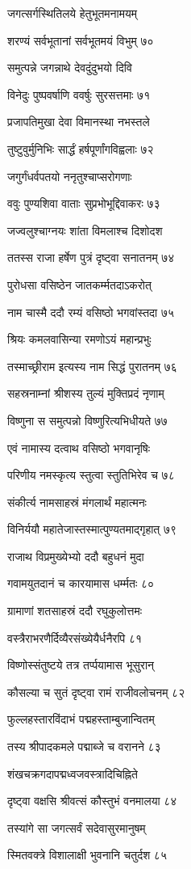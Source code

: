 जगत्सर्गस्थितिलये हेतुभूतमनामयम्

शरण्यं सर्वभूतानां सर्वभूतमयं विभुम् ७०

समुत्पन्ने जगन्नाथे देवदुंदुभयो दिवि

विनेदुः पुष्पवर्षाणि ववर्षुः सुरसत्तमाः ७१

प्रजापतिमुखा देवा विमानस्था नभस्तले

तुष्टुवुर्मुनिभिः सार्द्धं हर्षपूर्णांगविह्वलाः ७२

जगुर्गंधर्वपतयो ननृतुश्चाप्सरोगणाः

ववुः पुण्यशिवा वाताः सुप्रभोभूद्दिवाकरः ७३

जज्वलुश्चाग्नयः शांता विमलाश्च दिशोदश

ततस्स राजा हर्षेण पुत्रं दृष्ट्वा सनातनम् ७४

पुरोधसा वसिष्ठेन जातकर्म्मतदाऽकरोत्

नाम चास्मै ददौ रम्यं वसिष्ठो भगवांस्तदा ७५

श्रियः कमलवासिन्या रमणोऽयं महान्प्रभुः

तस्माच्छ्रीराम इत्यस्य नाम सिद्धं पुरातनम् ७६

सहस्रनाम्नां श्रीशस्य तुल्यं मुक्तिप्रदं नृणाम्

विष्णुना स समुत्पन्नो विष्णुरित्यभिधीयते ७७

एवं नामास्य दत्वाथ वसिष्ठो भगवानृषिः

परिणीय नमस्कृत्य स्तुत्वा स्तुतिभिरेव च ७८

संकीर्त्य नामसाहस्रं मंगलार्थं महात्मनः

विनिर्ययौ महातेजास्तस्मात्पुण्यतमाद्गृहात् ७९

राजाथ विप्रमुख्येभ्यो ददौ बहुधनं मुदा

गवामयुतदानं च कारयामास धर्म्मतः ८०

ग्रामाणां शतसाहस्रं ददौ रघुकुलोत्तमः

वस्त्रैराभरणैर्दिव्यैरसंख्येयैर्धनैरपि ८१

विष्णोस्संतुष्टये तत्र तर्प्पयामास भूसुरान्

कौसल्या च सुतं दृष्ट्वा रामं राजीवलोचनम् ८२

फुल्लहस्तारविंदाभं पद्महस्ताम्बुजान्वितम्

तस्य श्रीपादकमले पद्माब्जे च वरानने ८३

शंखचक्रगदापद्मध्वजवस्त्रादिचिह्निते

दृष्ट्वा वक्षसि श्रीवत्सं कौस्तुभं वनमालया ८४

तस्यांगे सा जगत्सर्वं सदेवासुरमानुषम्

स्मितवक्त्रे विशालाक्षी भुवनानि चतुर्दश ८५

